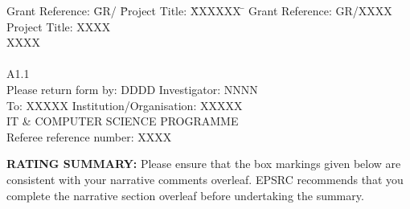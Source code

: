 \begin{tabbing}
%
Grant Reference:  \= GR/ \hspace*{4cm} \= Project Title: \hspace*{0.5cm} \= XXXXXX \= \kill
%
Grant Reference: \> GR/XXXX
                        \> Project Title: \> XXXX
\\
                  \>    \>  \> XXXX \\ %
\\
A1.1 \\
%
Please return form by: DDDD \> \> Investigator: \> \> NNNN \\
%
To: XXXXX  \> \> Institution/Organisation:  \> \> XXXXX \\
IT \& COMPUTER SCIENCE PROGRAMME \> \> \>  \\ %
\>  \> Referee reference number: \> \> XXXX
\end{tabbing}
\RULE

{\bf RATING SUMMARY:}  Please ensure that the box markings given below
are consistent with your narrative comments overleaf. EPSRC recommends
that you complete the narrative section overleaf before undertaking the
summary.


%


